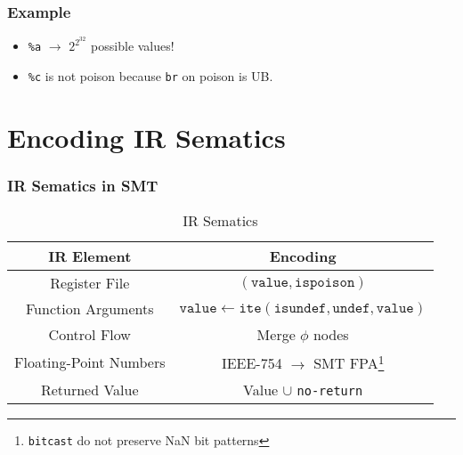 \documentclass[aspectratio=169]{ctexbeamer}
\newcommand{\variable}[1]{\mathtt{#1}}
\begin{document}
\begin{frame}[fragile]
    \frametitle{Example}
    \noindent
    \begin{minipage}[t]{0.5\linewidth}
        
    \end{minipage}
    \hfill%
    \begin{minipage}[t]{0.4\linewidth}
        \begin{itemize}
            \item  \texttt{\%a} $\rightarrow$ $2^{2^{32}}$ possible values!
            \item  \texttt{\%c} is not poison because \texttt{br} on poison is UB.
        \end{itemize}
    \end{minipage}
\end{frame}



\section{Encoding IR Sematics}

\begin{frame}
    \frametitle{IR Sematics in SMT}

    \begin{table}
        \centering
        \caption{IR Sematics}
        \begin{tabular}{cc}
            \toprule
            \textbf{IR Element}    & \textbf{Encoding}                                                                          \\
            \midrule
            Register File          & $(\variable{value}, \variable{ispoison})$                                                  \\
            Function Arguments     & $\variable{value} \leftarrow \mathtt{ite(isundef, undef, value)}$                          \\
            Control Flow           & Merge $\phi$ nodes                                                                         \\
            Floating-Point Numbers & IEEE-754 $\rightarrow$ SMT FPA\footnote{\texttt{bitcast} do not preserve NaN bit patterns} \\
            Returned Value         & Value $\cup$ \texttt{no-return}                                                            \\
            \bottomrule
        \end{tabular}
    \end{table}

\end{frame}
\end{document}
